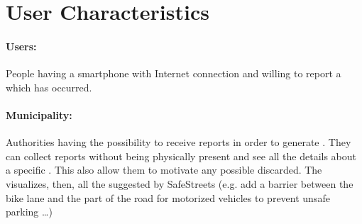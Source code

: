 \documentclass[../../RASD.tex]{subfiles}
\begin{document}
	
	\section{User Characteristics}

		\paragraph{Users:}
		People having a smartphone with Internet connection and willing to report a  which has occurred. 
		\paragraph{Municipality:}
		Authorities having the possibility to receive  reports in order to generate . They can collect reports without being physically present and see all the details about a specific . This also allow them to motivate any possible  discarded. The  visualizes, then, all the  suggested by SafeStreets (e.g. add a barrier between the bike lane and the part of the road for motorized vehicles to prevent unsafe parking …) 
		
		
\end{document}
